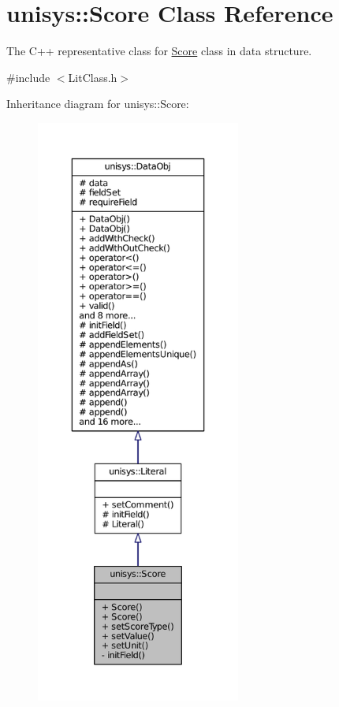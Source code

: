 \hypertarget{classunisys_1_1Score}{\section{unisys\-:\-:Score Class Reference}
\label{classunisys_1_1Score}
}


The C++ representative class for \hyperlink{classunisys_1_1Score}{Score} class in data structure.  




{\ttfamily \#include $<$Lit\-Class.\-h$>$}



Inheritance diagram for unisys\-:\-:Score\-:
\nopagebreak
\begin{figure}[H]
\begin{center}
\leavevmode
\includegraphics[height=550pt]{classunisys_1_1Score__inherit__graph}
\end{center}
\end{figure}


